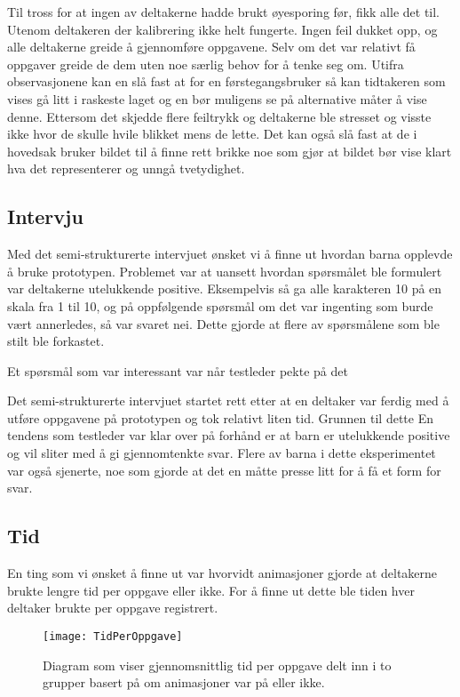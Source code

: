 Til tross for at ingen av deltakerne hadde brukt øyesporing før, fikk alle det til. Utenom deltakeren der kalibrering ikke helt fungerte. Ingen feil dukket opp, og alle deltakerne greide å gjennomføre oppgavene. Selv om det var relativt få oppgaver greide de dem uten noe særlig behov for å tenke seg om. Utifra observasjonene kan en slå fast at for en førstegangsbruker så kan tidtakeren som vises gå litt i raskeste laget og en bør muligens se på alternative måter å vise denne. Ettersom det skjedde flere feiltrykk og deltakerne ble stresset og visste ikke hvor de skulle hvile blikket mens de lette. Det kan også slå fast at de i hovedsak bruker bildet til å finne rett brikke noe som gjør at bildet bør vise klart hva det representerer og unngå tvetydighet. 


\subsection{Intervju}

Med det semi-strukturerte intervjuet ønsket vi å finne ut hvordan barna opplevde å bruke prototypen. Problemet var at uansett hvordan spørsmålet ble formulert var deltakerne utelukkende positive. Eksempelvis så ga alle karakteren 10 på en skala fra 1 til 10, og på oppfølgende spørsmål om det var ingenting som burde vært annerledes, så var svaret nei. Dette gjorde at flere av spørsmålene som ble stilt ble forkastet. 

Et spørsmål som var interessant var når testleder pekte på det

Det semi-strukturerte intervjuet startet rett etter at en deltaker var ferdig med å utføre oppgavene på prototypen og tok relativt liten tid. Grunnen til dette 
En tendens som testleder var klar over på forhånd er at barn er utelukkende positive og vil sliter med å gi gjennomtenkte svar. Flere av barna i dette eksperimentet var også sjenerte, noe som gjorde at det en måtte presse litt for å få et form for svar. 

\subsection{Tid}


En ting som vi ønsket å finne ut var hvorvidt animasjoner gjorde at deltakerne brukte lengre tid per oppgave eller ikke. For å finne ut dette ble tiden hver deltaker brukte per oppgave registrert. 

\begin{figure}[ht!]
\centering
\texttt{[image: TidPerOppgave]}
\caption{Diagram som viser gjennomsnittlig tid per oppgave delt inn i to grupper basert på om animasjoner var på eller ikke.}
\label{fig:DiagramTidPerOppgave}
\end{figure}

